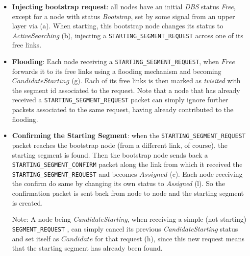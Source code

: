 \begin{itemize}

\item{\textbf{Injecting bootstrap request}}: all nodes have an initial
\emph{DBS} status \emph{Free}, except for a
 node with status \emph{Bootstrap}, set by some signal from an
upper layer via (a). When starting, this bootstrap node 
changes its status to \emph{ActiveSearching} (b), injecting a
\texttt{STARTING\_SEGMENT\_REQUEST} across one of its free links. 

\item{\textbf{Flooding}}: Each node receiving a \texttt{STARTING\_SEGMENT\_REQUEST},
when $Free$ forwards it to its free links using a flooding mechanism and
becoming $CandidateStarting$ (g).
Each of its free links is then marked as \emph{tvisited} with the segment id
associated to the request. Note that a node that has already received a
\texttt{STARTING\_SEGMENT\_REQUEST} packet can simply ignore further packets
associated to the same request, having already contributed to the
flooding. 

\item{\textbf{Confirming the Starting Segment}}: when the \texttt{STARTING\_SEGMENT\_REQUEST} packet reaches
the bootstrap node (from a different link, of course), the starting
segment is found. Then the bootstrap node sends back a \texttt{STARTING\_SEGMENT\_CONFIRM}
packet along the link from which it received the
\texttt{STARTING\_SEGMENT\_REQUEST} and becomes $Assigned$ (c). Each
node receiving the confirm do same by changing its own status
to \emph{Assigned} (l). So the confirmation packet is sent back from
node to node and the starting segment is created. 

Note: A node being \emph{CandidateStarting}, when receiving a simple
(not starting) \texttt{SEGMENT\_REQUEST} , can simply cancel its
previous \emph{CandidateStarting} status and set itself as
$Candidate$ for that request (h), since this new
request means that the starting segment has already been found. 




\end{itemize}
